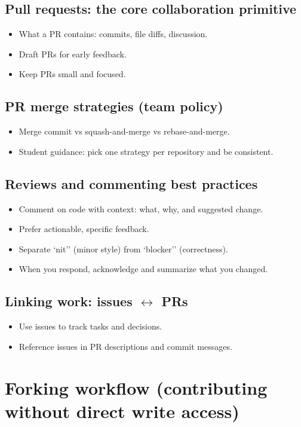 \subsection{Pull requests: the core collaboration primitive}
\begin{itemize}
\item What a PR contains: commits, file diffs, discussion.
\item Draft PRs for early feedback.
\item Keep PRs small and focused.
\end{itemize}

\subsection{PR merge strategies (team policy)}
\begin{itemize}
\item Merge commit vs squash-and-merge vs rebase-and-merge.
\item Student guidance: pick one strategy per repository and be consistent.
\end{itemize}

\subsection{Reviews and commenting best practices}
\begin{itemize}
\item Comment on code with context: what, why, and suggested change.
\item Prefer actionable, specific feedback.
\item Separate `nit'' (minor style) from `blocker'' (correctness).
\item When you respond, acknowledge and summarize what you changed.
\end{itemize}

\subsection{Linking work: issues $\leftrightarrow$ PRs}
\begin{itemize}
\item Use issues to track tasks and decisions.
\item Reference issues in PR descriptions and commit messages.
\end{itemize}

\section{Forking workflow (contributing without direct write access)}
